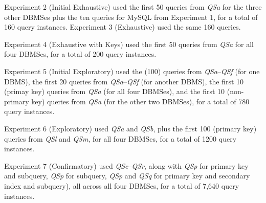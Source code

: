 \documentclass[prodmode,acmtods]{acmsmall}
\begin{document}
Experiment 2 (Initial Exhaustive) used the first 50 queries from {\em QSa}
for the three other DBMSes plus the ten queries for MySQL from Experiment 1, for
a total of 160 query instances. Experiment 3 (Exhaustive) used the same 160 queries.

Experiment 4 (Exhaustive with Keys) used the first 50 queries from {\em QSa}
for all four DBMSes, for a total of 200  query instances.

Experiment 5 (Initial Exploratory) used the (100) queries from {\em
  QSa}--{\em QSf} (for
one DBMS), the first 20 queries from {\em QSa}--{\em QSf} (for another DBMS), the first
10 (primay key) queries from {\em QSa} (for all four DBMSes), and the first 10
(non-primary key) queries from {\em QSa} (for the other two DBMSes), for a total of 780 query instances.

Experiment 6 (Exploratory) used {\em QSa} and {\em QSb}, plus the first 100 (primary
key) queries from {\em QSl} and {\em QSm}, for all four DBMSes, for a total of 1200 query
instances. 

Experiment 7 (Confirmatory) used {\em QSc}--{\em QSr}, along with {\em QSp} for primary key and
subquery, {\em QSp} for subquery, {\em QSp} and {\em QSq} for primary key and secondary index and
subquery), all across all four DBMSes, for a total of 7,640 query instances.

\end{document}

